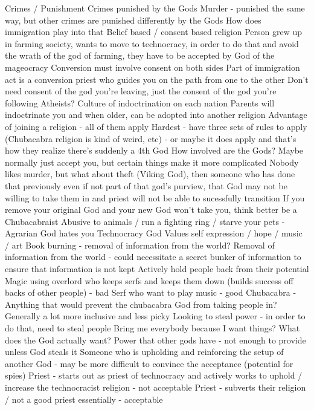 \documentclass[blue]{GL2020}
\begin{document}
Crimes / Punishment
Crimes punished by the Gods
Murder - punished the same way, but other crimes are punished differently by the Gods
How does immigration play into that
Belief based / consent based religion
Person grew up in farming society, wants to move to technocracy, in order to do that and avoid the wrath of the god of farming, they have to be accepted by God of the mageocracy
Conversion must involve consent on both sides
Part of immigration act is a conversion priest who guides you on the path from one to the other
Don’t need consent of the god you’re leaving, just the consent of the god you’re following
Atheists?
Culture of indoctrination on each nation
Parents will indoctrinate you and when older, can be adopted into another religion
Advantage of joining a religion - all of them apply
Hardest - have three sets of rules to apply (Chubacabra religion is kind of weird, etc) - or maybe it does apply and that’s how they realize there’s suddenly a 4th God
How involved are the Gods?
Maybe normally just accept you, but certain things make it more complicated
Nobody likes murder, but what about theft (Viking God), then someone who has done that previously even if not part of that god’s purview, that God may not be willing to take them in and priest will not be able to sucessfully transition
If you remove your original God and your new God won’t take you, think better be a Chubacabraist
Abusive to animals / run a fighting ring / starve your pets - Agrarian God hates you
Technocracy God
Values self expression / hope / music / art
Book burning - removal of information from the world?  Removal of information from the world - could necessitate a secret bunker of information to ensure that information is not kept
Actively hold people back from their potential
Magic using overlord who keeps serfs and keeps them down (builds success off backs of other people) - bad
Serf who want to play music - good
Chubacabra - Anything that would prevent the chubacabra God from taking people in?  Generally a lot more inclusive and less picky
Looking to steal power - in order to do that, need to steal people
Bring me everybody because I want things?
What does the God actually want?
Power that other gods have - not enough to provide unless God steals it
Someone who is upholding and reinforcing the setup of another God - may be more difficult to convince the acceptance (potential for spies)
Priest - starts out as priest of technocracy and actively works to uphold / increase the technocracist religion - not acceptable
Priest - subverts their religion / not a good priest essentially - acceptable
\end{document}
